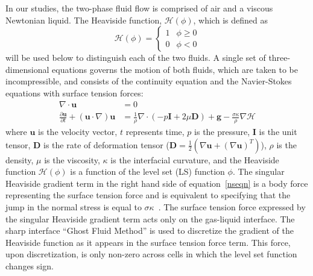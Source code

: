 \documentclass[review]{elsarticle}
\newcommand{\Hea}{\mathcal{H}}
\newcommand{\vv}{\mathbf}
\newcommand{\bmD}{\vv{D}}
\newcommand{\bmg}{\vv{g}}
\newcommand{\bmI}{\vv{I}}
\newcommand{\bmu}{\vv{u}}
\begin{document}
In our studies,
the two-phase fluid flow is comprised of air and a 
viscous Newtonian liquid.  
The Heaviside function, $\Hea(\phi)$, which is defined as
%
\begin{equation}\label{heavyeqn}
  \Hea(\phi) = \begin{cases}
               1 & \phi \geq 0 \\
               0 & \phi <0 
               \end{cases}
\end{equation}
%
will be used below to distinguish each of the two fluids.  A single set of
three-dimensional equations governs the motion of both fluids, which are taken
to be incompressible, and consists of the continuity equation and the
Navier-Stokes equations with surface tension forces:
%
\begin{align}
  \nabla\cdot\bmu &=0  \label{divu} \\
  \frac{\partial\bmu}{\partial t}+(\bmu\cdot\nabla)\bmu &=
  \frac{1}{\rho}\nabla\cdot(-p\bmI+2\mu\bmD)+\bmg-
  \frac{\sigma\kappa}{\rho}\nabla \Hea  
  \label{nseqn}
\end{align}
%
%
where $\bmu$ is the velocity vector, $t$ represents time, $p$ is the pressure,
$\bmI$ is the unit tensor, $\bmD$ is the rate of deformation tensor
($\bmD=\frac{1}{2}(\nabla\bmu+(\nabla\bmu)^{T})$), $\rho$ is the density, $\mu$
is the viscosity, $\kappa$ is the interfacial curvature, and the Heaviside
function $\Hea(\phi)$ is a function of the level set (LS) function $\phi$. The
singular Heaviside gradient term in the right hand side of
equation~\eqref{nseqn} is a body force representing the surface tension force
and is equivalent to specifying that the jump in the normal stress is equal to
$\sigma\kappa$~\cite{TanguyEtAl2007}.  The surface tension force expressed by
the singular Heaviside gradient term acts only on the gas-liquid interface.
The sharp interface ``Ghost Fluid Method'' \cite{kang2000boundary} is used to
discretize the gradient of the Heaviside function as it appears in the surface
tension force term.  This force, upon discretization, is only non-zero across
cells in which the level set function changes sign.
\end{document}
